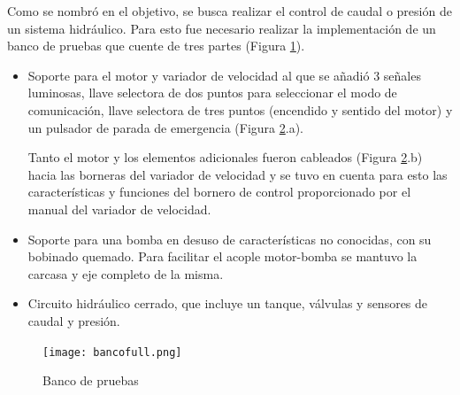 Como se nombró en el objetivo, se busca realizar el control de caudal o presión de un sistema hidráulico. Para esto fue necesario realizar la implementación de un banco de pruebas que cuente de tres partes (Figura \ref{fig:bancofull}).
\begin{itemize}
	\item Soporte para el motor y variador de velocidad al que se añadió 3 señales luminosas, llave selectora de dos puntos para seleccionar el modo de comunicación, llave selectora de tres puntos (encendido y sentido del motor) y un pulsador de parada de emergencia (Figura \ref{fig:banco}.a).

	Tanto el motor y los elementos adicionales fueron cableados (Figura \ref{fig:banco}.b) hacia las borneras del variador de velocidad y se tuvo en cuenta para esto las características y funciones del bornero de control proporcionado por el manual del variador de velocidad\cite{InstaManual}. 
	
	\item Soporte para una bomba en desuso de características no conocidas, con su bobinado quemado. Para facilitar el acople motor-bomba se mantuvo la carcasa y eje completo de la misma.
	\item Circuito hidráulico cerrado, que incluye un tanque, válvulas y sensores de caudal y presión.
\end{itemize}




\begin{figure}[htb]
	\centering
	\texttt{[image: bancofull.png]}
	\label{fig:bancofull}
\end{figure}


\begin{figure}[H]
	\centering
	\caption{Banco de pruebas} \label{fig:banco}
\end{figure}

